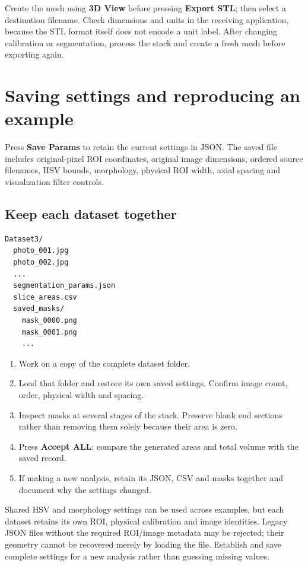 \documentclass[11pt,a4paper]{article}
\newcommand{\button}[1]{\textbf{#1}}
\begin{document}
Create the mesh using \button{3D View} before pressing \button{Export STL}; then select a destination filename. Check dimensions and units in the receiving application, because the STL format itself does not encode a unit label. After changing calibration or segmentation, process the stack and create a fresh mesh before exporting again.

\clearpage
\section{Saving settings and reproducing an example}
Press \button{Save Params} to retain the current settings in JSON. The saved file includes original-pixel ROI coordinates, original image dimensions, ordered source filenames, HSV bounds, morphology, physical ROI width, axial spacing and visualization filter controls.

\subsection{Keep each dataset together}
\begin{lstlisting}
Dataset3/
  photo_001.jpg
  photo_002.jpg
  ...
  segmentation_params.json
  slice_areas.csv
  saved_masks/
    mask_0000.png
    mask_0001.png
    ...
\end{lstlisting}
\begin{enumerate}
\item Work on a copy of the complete dataset folder.
\item Load that folder and restore its own saved settings. Confirm image count, order, physical width and spacing.
\item Inspect masks at several stages of the stack. Preserve blank end sections rather than removing them solely because their area is zero.
\item Press \button{Accept ALL}; compare the generated areas and total volume with the saved record.
\item If making a new analysis, retain its JSON, CSV and masks together and document why the settings changed.
\end{enumerate}
Shared HSV and morphology settings can be used across examples, but each dataset retains its own ROI, physical calibration and image identities. Legacy JSON files without the required ROI/image metadata may be rejected; their geometry cannot be recovered merely by loading the file. Establish and save complete settings for a new analysis rather than guessing missing values.
\end{document}
